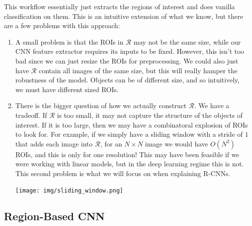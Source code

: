 \documentclass{article}
\theoremstyle{definition}
\theoremstyle{remark}
\theoremstyle{definition}
\begin{document}
  This workflow essentially just extracts the regions of interest and does vanilla classification on them. This is an intuitive extension of what we know, but there are a few problems with this approach: 
  \begin{enumerate}
    \item A small problem is that the ROIs in $\mathcal{R}$ may not be the same size, while our CNN feature extractor requires its inputs to be fixed. However, this isn't too bad since we can just resize the ROIs for preprocessing. We could also just have $\mathcal{R}$ contain all images of the same size, but this will really hamper the robustness of the model. Objects can be of different size, and so intuitively, we must have different sized ROIs. 

    \item There is the bigger question of how we actually construct $\mathcal{R}$. We have a tradeoff. If $\mathcal{R}$ is too small, it may not capture the structure of the objects of interest. If it is too large, then we may have a combinatoral explosion of ROIs to look for. For example, if we simply have a sliding window with a stride of $1$ that adds each image into $\mathcal{R}$, for an $N \times N$ image we would have $O(N^2)$ ROIs, and this is only for one resolution! This may have been feasible if we were working with linear models, but in the deep learning regime this is not. This second problem is what we will focus on when explaining R-CNNs. 
    
      \begin{center}
        \texttt{[image: img/sliding\_window.png]}
      \end{center}
  \end{enumerate}

  \subsection{Region-Based CNN}
\end{document}
